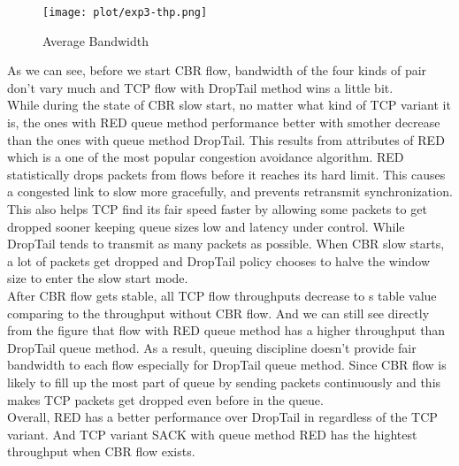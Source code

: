 \documentclass[10pt, conference]{lib/IEEEtran}
\begin{document}
\begin{figure}[!htb]
    \centering
    \texttt{[image: plot/exp3-thp.png]}
    \caption{Average Bandwidth}
    \label{fig:exp3-thp}
\end{figure}
As we can see, before we start CBR flow, bandwidth of the four kinds of pair don't vary much and TCP flow with DropTail method wins a little bit.\\

While during the state of CBR slow start, no matter what kind of TCP variant it is, the ones with RED queue method performance better with smother decrease than the ones with queue method DropTail. This results from attributes of RED which is a one of the most popular congestion avoidance algorithm. RED statistically drops packets from flows before it reaches its hard limit. This causes a congested link to slow more gracefully, and prevents retransmit synchronization. This also helps TCP find its fair speed faster by allowing some packets to get dropped sooner keeping queue sizes low and latency under control. While DropTail tends to transmit as many packets as possible. When CBR slow starts, a lot of packets get dropped and DropTail policy chooses to halve the window size to enter the slow start mode.\\

After CBR flow gets stable, all TCP flow throughputs decrease to s table value comparing to the throughput without CBR flow. And we can still see directly from the figure that flow with RED queue method has a higher throughput than DropTail queue method. As a result, queuing discipline doesn’t provide fair bandwidth to each flow especially for DropTail queue method. Since CBR flow is likely to fill up the most part of queue by sending packets continuously and this makes TCP packets get dropped even before in the queue.\\

Overall, RED has a better performance over DropTail in regardless of the TCP variant. And TCP variant SACK with queue method RED has the hightest throughput when CBR flow exists.\\
\end{document}
